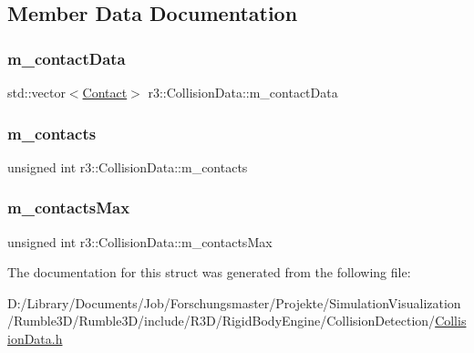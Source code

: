 \subsection{Member Data Documentation}
\mbox{\label{structr3_1_1_collision_data_a39dcfed493cd263aeb4a7c250a439d19}} 
\subsubsection{\texorpdfstring{m\+\_\+contact\+Data}{m\_contactData}}
{\footnotesize\ttfamily std\+::vector$<$\mbox{\hyperlink{classr3_1_1_contact}{Contact}}$>$ r3\+::\+Collision\+Data\+::m\+\_\+contact\+Data}

\mbox{\label{structr3_1_1_collision_data_a79384b55832be3c4ec4827a727e99963}} 
\subsubsection{\texorpdfstring{m\+\_\+contacts}{m\_contacts}}
{\footnotesize\ttfamily unsigned int r3\+::\+Collision\+Data\+::m\+\_\+contacts}

\mbox{\label{structr3_1_1_collision_data_a6ca37bba9db5d95027b486b17f51bde3}} 
\subsubsection{\texorpdfstring{m\+\_\+contacts\+Max}{m\_contactsMax}}
{\footnotesize\ttfamily unsigned int r3\+::\+Collision\+Data\+::m\+\_\+contacts\+Max}



The documentation for this struct was generated from the following file\+:\begin{DoxyCompactItemize}
\item 
D\+:/\+Library/\+Documents/\+Job/\+Forschungsmaster/\+Projekte/\+Simulation\+Visualization/\+Rumble3\+D/\+Rumble3\+D/include/\+R3\+D/\+Rigid\+Body\+Engine/\+Collision\+Detection/\mbox{\hyperlink{_collision_data_8h}{Collision\+Data.\+h}}\end{DoxyCompactItemize}
